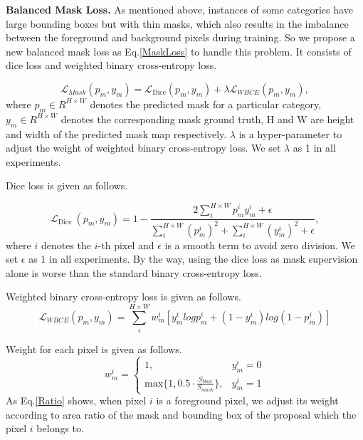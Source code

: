 \documentclass[runningheads]{llncs}
\begin{document}
 \noindent \textbf{Balanced Mask Loss.}
 As mentioned above, instances of some categories have large bounding boxes but with thin masks, which also results in the imbalance between the foreground and background pixels during training. So we propose a new balanced mask loss as Eq.\ref{MaskLoss} to handle this problem. It consists of dice loss \cite{milletari2016v} and weighted binary cross-entropy loss.

\begin{equation}
    \label{MaskLoss}
    \mathcal{L}_{Mask}\left(p_{m}, y_{m}\right)=\mathcal{L}_{\text {Dice}}\left(p_{m}, y_{m}\right) + \mathcal\lambda \mathcal{L}_{WBCE}\left(p_{m}, y_{m}\right),
\end{equation}
where $p_m \in R^{H\times W}$ denotes the predicted mask for a particular category, $y_m \in R^{H\times W}$ denotes the corresponding mask ground truth, H and W are height and width of the predicted mask map respectively. $\lambda $ is a hyper-parameter to adjust the weight of weighted binary cross-entropy loss. We set $\lambda$ as 1 in all experiments.

\noindent Dice loss is given as follows.

\begin{equation}
    \mathcal{L}_{\text {Dice }}\left(p_{m}, y_{m}\right)=1-\frac{2 \sum_{i}^{H \times W} p_{m}^{i} y_{m}^{i}+\epsilon}{\sum_{i}^{H \times W}\left(p_{m}^{i}\right)^{2}+\sum_{i}^{H \times W}\left(y_{m}^{i}\right)^{2}+\epsilon},
\end{equation}
where $i$ denotes the $i$-th pixel and $\epsilon $ is a smooth term to avoid zero division. We set $\epsilon$ as 1 in all experiments. By the way, using the dice loss as mask supervision alone is worse than the standard binary cross-entropy loss.

\noindent Weighted binary cross-entropy loss is given as follows.
\begin{equation}
    \mathcal{L}_{WBCE }\left(p_{m}, y_{m}\right)=\sum_{i}^{H \times W} w_{m}^{i} [y_{m}^{i} logp_{m}^{i} + (1-y_{m}^{i})log(1-p_{m}^{i})]
\end{equation}

\noindent Weight for each pixel is given as follows.
 \begin{equation}
    \label{Ratio}
    w_{m}^{i} = \left\{
             \begin{array}{lr}
             1  , & y_{m}^{i}=0 \\
            \text{max}\lbrace 1, 0.5 \cdot \frac{S_{bbox}}{S_{mask}} \rbrace, & y_{m}^{i}=1 
             \end{array}
        \right.
 \end{equation}
 As Eq.\ref{Ratio} shows, when pixel $i$ is a foreground pixel, we adjust its weight according to area ratio 
 of the mask and bounding box of the proposal which the pixel $i$ belongs to.
 
\end{document}
